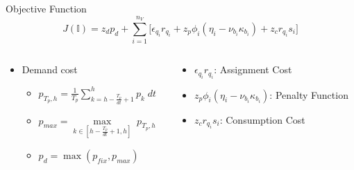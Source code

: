 \documentclass[aspectratio=169]{beamer}
\begin{document}
\begin{frame}[label={sec:orgd7865a9}]{Objective Function}
\begin{equation*}
  J(\mathbb{I}) = z_d p_d + \sum_{i=1}^{n_V} \Big[ \epsilon_{q_i}r_{q_i} + z_p \phi_i(\eta_i - \nu_{b_i} \kappa_{b_i}) + z_c r_{q_i} s_i \Big]
\end{equation*}

\begin{columns}
\begin{column}{0.5\columnwidth}
\begin{itemize}
\item Demand cost
\begin{itemize}
\item \(p_{T_p,h} = \frac{1}{T_p} \sum_{k = h-\frac{T_p}{dt}+1}^h p_k\; dt\)
\item \(p_{max} = \max\limits_{k \in [h-\frac{T_p}{dt}+1, h]}\; p_{T_p,h}\)
\item \(p_d = \max(p_{fix}, p_{max})\)
\end{itemize}
\end{itemize}
\end{column}

\begin{column}{0.5\columnwidth}
\begin{itemize}
\item \(\epsilon_{q_i}r_{q_i}\): Assignment Cost
\item \(z_p \phi_i(\eta_i - \nu_{b_i} \kappa_{b_i})\): Penalty Function
\item \(z_c r_{q_i} s_i\): Consumption Cost
\end{itemize}
\end{column}
\end{columns}
\end{frame}
\end{document}
